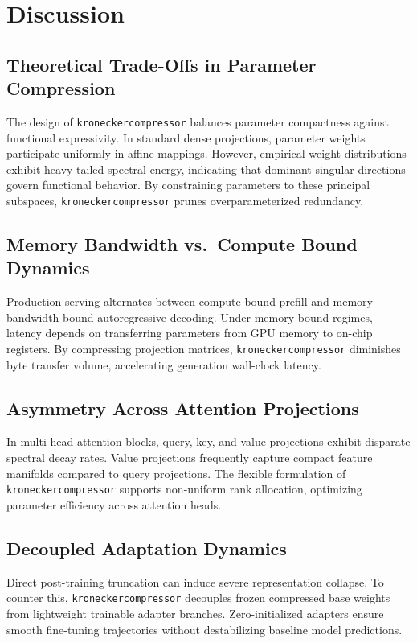 \section{Discussion}

\subsection{Theoretical Trade-Offs in Parameter Compression}
The design of \texttt{kroneckercompressor} balances parameter compactness against functional expressivity. In standard dense projections, parameter weights participate uniformly in affine mappings. However, empirical weight distributions exhibit heavy-tailed spectral energy, indicating that dominant singular directions govern functional behavior. By constraining parameters to these principal subspaces, \texttt{kroneckercompressor} prunes overparameterized redundancy.

\subsection{Memory Bandwidth vs.\ Compute Bound Dynamics}
Production serving alternates between compute-bound prefill and memory-bandwidth-bound autoregressive decoding. Under memory-bound regimes, latency depends on transferring parameters from GPU memory to on-chip registers. By compressing projection matrices, \texttt{kroneckercompressor} diminishes byte transfer volume, accelerating generation wall-clock latency.

\subsection{Asymmetry Across Attention Projections}
In multi-head attention blocks, query, key, and value projections exhibit disparate spectral decay rates. Value projections frequently capture compact feature manifolds compared to query projections. The flexible formulation of \texttt{kroneckercompressor} supports non-uniform rank allocation, optimizing parameter efficiency across attention heads.

\subsection{Decoupled Adaptation Dynamics}
Direct post-training truncation can induce severe representation collapse. To counter this, \texttt{kroneckercompressor} decouples frozen compressed base weights from lightweight trainable adapter branches. Zero-initialized adapters ensure smooth fine-tuning trajectories without destabilizing baseline model predictions.

